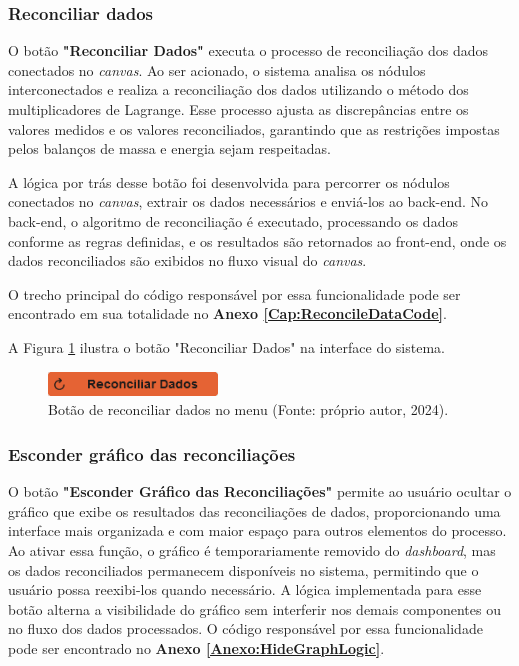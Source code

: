 \subsubsection{Reconciliar dados}

O botão \textbf{"Reconciliar Dados"} executa o processo de reconciliação dos dados conectados no \textit{canvas}. Ao ser acionado, o sistema analisa os nódulos interconectados e realiza a reconciliação dos dados utilizando o método dos multiplicadores de Lagrange. Esse processo ajusta as discrepâncias entre os valores medidos e os valores reconciliados, garantindo que as restrições impostas pelos balanços de massa e energia sejam respeitadas.

A lógica por trás desse botão foi desenvolvida para percorrer os nódulos conectados no \textit{canvas}, extrair os dados necessários e enviá-los ao back-end. No back-end, o algoritmo de reconciliação é executado, processando os dados conforme as regras definidas, e os resultados são retornados ao front-end, onde os dados reconciliados são exibidos no fluxo visual do \textit{canvas}.

O trecho principal do código responsável por essa funcionalidade pode ser encontrado em sua totalidade no \textbf{Anexo \ref{Cap:ReconcileDataCode}}.

A Figura \ref{Fig:ReconcileButton} ilustra o botão "Reconciliar Dados" na interface do sistema.

\begin{figure}[htbp]
    \centering
    \includegraphics[width=0.4\textwidth]{figuras/reconcile-data-button.png}
    \caption{Botão de reconciliar dados no menu (Fonte: próprio autor, 2024).}
    \label{Fig:ReconcileButton}
\end{figure}

\subsubsection{Esconder gráfico das reconciliações}

O botão \textbf{"Esconder Gráfico das Reconciliações"} permite ao usuário ocultar o gráfico que exibe os resultados das reconciliações de dados, proporcionando uma interface mais organizada e com maior espaço para outros elementos do processo. Ao ativar essa função, o gráfico é temporariamente removido do \textit{dashboard}, mas os dados reconciliados permanecem disponíveis no sistema, permitindo que o usuário possa reexibi-los quando necessário. A lógica implementada para esse botão alterna a visibilidade do gráfico sem interferir nos demais componentes ou no fluxo dos dados processados. O código responsável por essa funcionalidade pode ser encontrado no \textbf{Anexo \ref{Anexo:HideGraphLogic}}.

